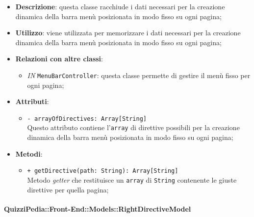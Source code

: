		\begin{itemize}
			\item \textbf{Descrizione}: questa classe racchiude i dati necessari per la creazione dinamica della barra menù posizionata in modo fisso su ogni pagina;
			\item \textbf{Utilizzo}: viene utilizzata per memorizzare i dati necessari per la creazione dinamica della barra menù posizionata in modo fisso su ogni pagina;
			\item \textbf{Relazioni con altre classi}: 
			\begin{itemize}
				\item \textit{IN} \texttt{MenuBarController}: questa classe permette di gestire il menù fisso per ogni pagina;
			\end{itemize}
			\item \textbf{Attributi}: 
			\begin{itemize}
				\item \texttt{- arrayOfDirectives: Array[String]}\\
				Questo attributo contiene l'\texttt{array} di direttive possibili per la creazione dinamica della barra menù posizionata in modo fisso su ogni pagina;
			\end{itemize}
			\item \textbf{Metodi}: 
			\begin{itemize}
				\item \texttt{+ getDirective(path: String): Array[String]} \\
				Metodo \textit{getter} che restituisce un \texttt{array} di \texttt{String} contenente le giuste direttive per quella pagina;
				
			\end{itemize}
		\end{itemize}		
		
		
		\paragraph{QuizziPedia::Front-End::Models::RightDirectiveModel}
		
		\label{QuizziPedia::Front-End::Models::RightDirectiveModel}
		
